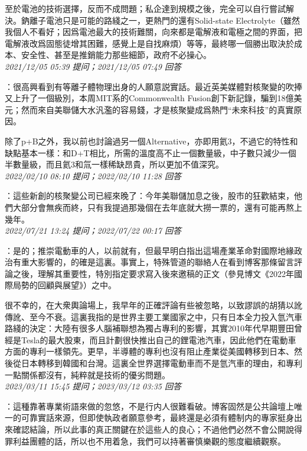 \documentclass[twocolumn]{ctexart}
\begin{document}
至於電池的技術選擇，反而不成問題；私企達到規模之後，完全可以自行嘗試解決。鈉離子電池只是可能的路綫之一，更熱門的還有Solid-state Electrolyte（雖然我個人不看好；因爲電池最大的技術難關，向來都是電解液和電極之間的界面，把電解液改爲固態徒增其困難，感覺上是自找麻煩）等等，最終哪一個勝出取決於成本、安全性、甚至是推銷能力那些細節，政府不必操心。
\\

\textit{\hfill\noindent\small 2021/12/05 05:39 提问；2021/12/05 07:49 回答}

：很高興看到有等離子體物理出身的人願意説實話。最近英美媒體對核聚變的吹捧又上升了一個級別，本周MIT系的Commonwealth Fusion創下新記錄，騙到18億美元；然而來自美聯儲大水汎濫的容易錢，才是核聚變成爲熱門“未來科技”的真實原因。

除了p+B之外，我以前也討論過另一個Alternative，亦即用氦3，不過它的特性和缺點基本一樣：和D+T相比，所需的溫度高不止一個數量級，中子數只減少一個半數量級，而且氦3和氚一樣稀缺昂貴，所以更加不值深究。
\\

\textit{\hfill\noindent\small 2022/02/10 08:10 提问；2022/02/10 11:28 回答}

：這些新創的核聚變公司已經來晚了：今年美聯儲加息之後，股市的狂歡結束，他們大部分會無疾而終，只有我提過那幾個在去年底就大撈一票的，還有可能再熬上幾年。
\\

\textit{\hfill\noindent\small 2022/07/21 13:24 提问；2022/07/22 00:17 回答}

：是的；推崇電動車的人，以前就有，但最早明白指出這場產業革命對國際地緣政治有重大影響的，的確是這裏。事實上，特殊管道的聯絡人在看到博客那條留言評論之後，理解其重要性，特別指定要求寫入後來邀稿的正文（參見博文《2022年國際局勢的回顧與展望》）之中。

很不幸的，在大衆輿論場上，我早年的正確評論有些被忽略，以致謬誤的胡猜以訛傳訛、至今不衰。這裏我指的是世界主要工業國家之中，只有日本全力投入氫汽車路綫的決定：大陸有很多人腦補聯想為獨占專利的影響，其實2010年代早期豐田曾經是Tesla的最大股東，而且計劃很快推出自己的鋰電池汽車，因此他們在電動車方面的專利一樣領先。更早，半導體的專利也沒有阻止產業從美國轉移到日本、然後從日本轉移到韓國和台灣。這裏全世界選擇電動車而不是氫汽車的理由，和專利一點關係都沒有，純粹就是技術的優劣問題。
\\

\textit{\hfill\noindent\small 2023/03/11 15:45 提问；2023/03/12 03:35 回答}

：這種靠著專業術語來做的忽悠，不是行内人很難看破。博客固然是公共論壇上唯一的可靠實話來源，但即使執政者願意參考，最終還是必須有體制内的專家挺身出來確認結論，所以此事的真正關鍵在於這些人的良心；不過他們必然不會公開說得罪利益團體的話，所以也不用着急，我們可以持著審慎樂觀的態度繼續觀察。
\\
\end{document}
